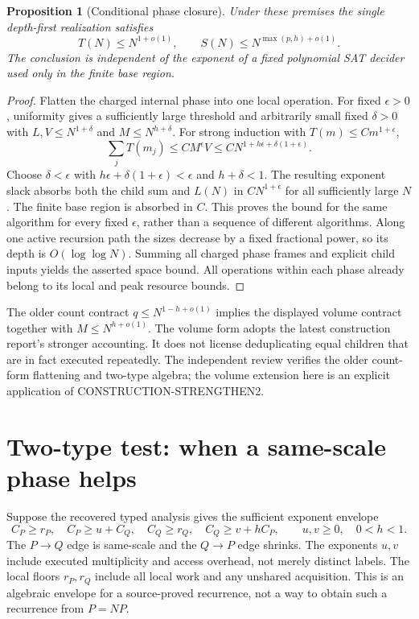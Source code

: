 \documentclass[11pt]{article}
\newtheorem{proposition}{Proposition}
\begin{document}
\begin{proposition}[Conditional phase closure]
Under these premises the single depth-first realization satisfies
\[
 T(N)\le N^{1+o(1)},\qquad
 S(N)\le N^{\max(p,h)+o(1)}.
\]
The conclusion is independent of the exponent of a fixed polynomial SAT
decider used only in the finite base region.
\end{proposition}
\begin{proof}
Flatten the charged internal phase into one local operation. For fixed
$\epsilon>0$, uniformity gives a sufficiently large threshold and arbitrarily
small fixed $\delta>0$ with $L,V\le N^{1+\delta}$ and
$M\le N^{h+\delta}$. For strong induction with $T(m)\le C m^{1+\epsilon}$,
\[
 \sum_jT(m_j)\le C M^\epsilon V
 \le C N^{1+h\epsilon+\delta(1+\epsilon)}.
\]
Choose $\delta<\epsilon$ with
$h\epsilon+\delta(1+\epsilon)<\epsilon$ and $h+\delta<1$.
The resulting exponent slack absorbs both the child sum and $L(N)$
in $CN^{1+\epsilon}$ for all sufficiently large $N$. The finite base
region is absorbed in $C$. This proves the bound for the same algorithm
for every fixed $\epsilon$, rather than a sequence of different algorithms.
Along one active recursion path the sizes decrease by a fixed fractional
power, so its depth is $O(\log\log N)$. Summing all charged phase frames
and explicit child inputs yields the asserted space bound. All operations
within each phase already belong to its local and peak resource bounds.
\end{proof}

The older count contract $q\le N^{1-h+o(1)}$ implies the displayed volume
contract together with $M\le N^{h+o(1)}$. The volume form adopts the latest
construction report's stronger accounting. It does not license deduplicating
equal children that are in fact executed repeatedly. The independent review
verifies the older count-form flattening and two-type algebra; the volume
extension here is an explicit application of CONSTRUCTION-STRENGTHEN2.

\section*{Two-type test: when a same-scale phase helps}
Suppose the recovered typed analysis gives the sufficient exponent envelope
\[
 C_P\ge r_P,\quad C_P\ge u+C_Q,\quad
 C_Q\ge r_Q,\quad C_Q\ge v+hC_P,
 \qquad u,v\ge0,\quad 0<h<1.
\]
The $P\to Q$ edge is same-scale and the $Q\to P$ edge shrinks. The
exponents $u,v$ include executed multiplicity and access overhead, not
merely distinct labels. The local floors $r_P,r_Q$ include all local
work and any unshared acquisition. This is an algebraic envelope for a
source-proved recurrence, not a way to obtain such a recurrence from $P=NP$.
\end{document}
